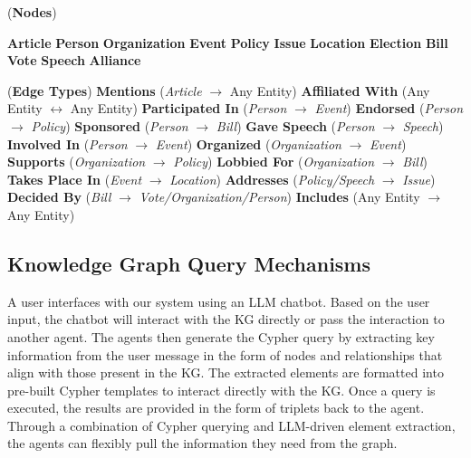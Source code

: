 \documentclass[11pt]{article}
\begin{document}
\renewcommand{\thealgocf}{3}
\begin{algorithm}[h!]
\caption{Initialize News Knowledge Graph Schema}


\Define (\textbf{Nodes})
{

    {\textbf{Article}\;
    \textbf{Person}\;
    \textbf{Organization}\;
    \textbf{Event}\;
    \textbf{Policy}\;
    \textbf{Issue}\;
    \textbf{Location}\;
    \textbf{Election}\;
    \textbf{Bill}\;
    \textbf{Vote}\;
    \textbf{Speech}\;
    \textbf{Alliance}\;}
}

\Define (\textbf{Edge Types})
{
    \textbf{Mentions} (\textit{Article} $\rightarrow$ Any Entity)\;
    \textbf{Affiliated With} (Any Entity $\leftrightarrow$ Any Entity)\;
    \textbf{Participated In} (\textit{Person} $\rightarrow$ \textit{Event})\;
    \textbf{Endorsed} (\textit{Person} $\rightarrow$ \textit{Policy})\;
    \textbf{Sponsored} (\textit{Person} $\rightarrow$ \textit{Bill})\;
    \textbf{Gave Speech} (\textit{Person} $\rightarrow$ \textit{Speech})\;
    \textbf{Involved In} (\textit{Person} $\rightarrow$ \textit{Event})\;
    \textbf{Organized} (\textit{Organization} $\rightarrow$ \textit{Event})\;
    \textbf{Supports} (\textit{Organization} $\rightarrow$ \textit{Policy})\;
    \textbf{Lobbied For} (\textit{Organization} $\rightarrow$ \textit{Bill})\;
    \textbf{Takes Place In} (\textit{Event} $\rightarrow$ \textit{Location})\;
    \textbf{Addresses} (\textit{Policy/Speech} $\rightarrow$ \textit{Issue})\;
    \textbf{Decided By} (\textit{Bill} $\rightarrow$ \textit{Vote/Organization/Person})\;
    \textbf{Includes} (Any Entity $\rightarrow$ Any Entity)\;
}


\end{algorithm}


\subsection{ Knowledge Graph Query Mechanisms}
A user interfaces with our system using an LLM chatbot. Based on the user input, the chatbot will interact with the KG directly or pass the interaction to another agent. The agents then generate the Cypher query by extracting key information from the user message in the form of nodes and relationships that align with those present in the KG. The extracted elements are formatted into  pre-built Cypher templates to interact directly with the KG. Once a query is executed, the results are provided in the form of triplets back to the agent. Through a combination of Cypher querying and LLM-driven element extraction, the agents can flexibly pull the information they need from the graph.
 
\end{document}
